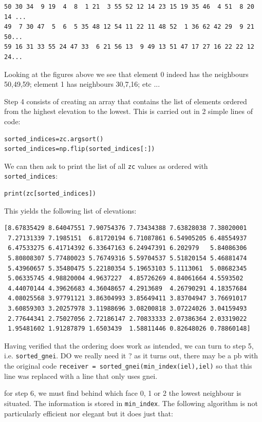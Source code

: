 \begin{lstlisting}
50 30 34  9 19  4  8  1 21  3 55 52 12 14 23 15 19 35 46  4 51  8 20 14 ... 
49  7 30 47  5  6  5 35 48 12 54 11 22 11 48 52  1 36 62 42 29  9 21 50...
59 16 31 33 55 24 47 33  6 21 56 13  9 49 13 51 47 17 27 16 22 22 12 24...
\end{lstlisting}
Looking at the figures above we see that element 0 indeed has the neighbours 50,49,59;
element 1 has neighbours 30,7,16; etc ...

Step 4 consists of creating an array that contains the list of elements ordered from the 
highest elevation to the lowest.
This is carried out in 2 simple lines of code:
\begin{lstlisting}
sorted_indices=zc.argsort()
sorted_indices=np.flip(sorted_indices[:])
\end{lstlisting}
We can then ask to print the list of all {\tt zc} values as ordered with 
{\tt sorted\_indices}:
\begin{lstlisting}
print(zc[sorted_indices])
\end{lstlisting}
This yields the following list of elevations:
\begin{lstlisting}
[8.67835429 8.64047551 7.90754376 7.73434388 7.63828038 7.38020001
 7.27131339 7.1985151  6.81720194 6.71087861 6.54905205 6.48554937
 6.47533275 6.41714392 6.33647163 6.24947391 6.202979   5.84086306
 5.80808307 5.77480023 5.76749316 5.59704537 5.51820154 5.46881474
 5.43960657 5.35480475 5.22180354 5.19653103 5.1113061  5.08682345
 5.06335745 4.98820004 4.9637227  4.85726269 4.84061664 4.5593502
 4.44070144 4.39626683 4.36048657 4.2913689  4.26790291 4.18357684
 4.08025568 3.97791121 3.86304993 3.85649411 3.83704947 3.76691017
 3.60859303 3.20257978 3.11988696 3.08200818 3.07224026 3.04159493
 2.77644341 2.75027056 2.72186147 2.70833333 2.07386364 2.03319022
 1.95481602 1.91287879 1.6503439  1.58811446 0.82648026 0.78860148]
\end{lstlisting}

Having verified that the ordering does work as intended, 
we can turn to step 5, i.e. {\tt sorted\_gnei}. DO we really need it ?
as it turns out, there may be a pb with the original code 
{\tt receiver = sorted\_gnei(min\_index(iel),iel)}
so that this line was replaced with a line that only uses gnei.

for step 6, we must find behind which face 0, 1 or 2 
the lowest neighbour is situated. The information is stored in {\tt min\_index}.
The following algorithm is not particularly efficient nor elegant but it does 
just that: 

